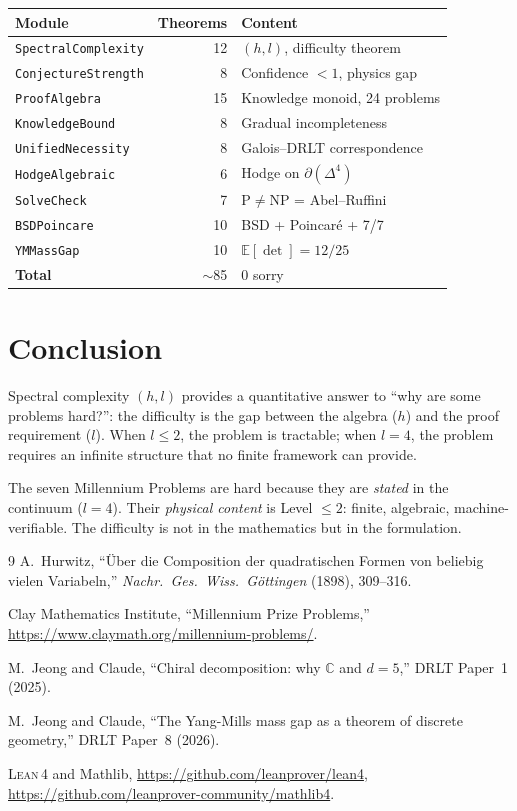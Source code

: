 \documentclass[12pt]{article}
\theoremstyle{remark}
\newcommand{\CC}{\mathbb{C}}
\newcommand{\Lean}{\textsc{Lean\,4}}
\begin{document}
\begin{center}
\begin{tabular}{lrl}
\toprule
Module & Theorems & Content \\
\midrule
\texttt{SpectralComplexity} & 12 & $(h, l)$, difficulty theorem \\
\texttt{ConjectureStrength} & 8 & Confidence $< 1$, physics gap \\
\texttt{ProofAlgebra} & 15 & Knowledge monoid, 24 problems \\
\texttt{KnowledgeBound} & 8 & Gradual incompleteness \\
\texttt{UnifiedNecessity} & 8 & Galois--DRLT correspondence \\
\texttt{HodgeAlgebraic} & 6 & Hodge on $\partial(\Delta^4)$ \\
\texttt{SolveCheck} & 7 & P$\ne$NP = Abel--Ruffini \\
\texttt{BSDPoincare} & 10 & BSD + Poincar\'e + 7/7 \\
\texttt{YMMassGap} & 10 & $\mathbb{E}[\det] = 12/25$ \\
\midrule
\textbf{Total} & $\sim$85 & 0 sorry \\
\bottomrule
\end{tabular}
\end{center}

\section{Conclusion}

Spectral complexity $(h, l)$ provides a quantitative answer
to ``why are some problems hard?'': the difficulty is the
gap between the algebra ($h$) and the proof requirement ($l$).
When $l \le 2$, the problem is tractable; when $l = 4$,
the problem requires an infinite structure that no finite
framework can provide.

The seven Millennium Problems are hard because they are
\emph{stated} in the continuum ($l = 4$). Their
\emph{physical content} is Level $\le 2$: finite,
algebraic, machine-verifiable. The difficulty is not in
the mathematics but in the formulation.

\begin{thebibliography}{9}
A.~Hurwitz, ``\"Uber die Composition der quadratischen
Formen von beliebig vielen Variabeln,''
\emph{Nachr.\ Ges.\ Wiss.\ G\"ottingen} (1898), 309--316.

Clay Mathematics Institute, ``Millennium Prize Problems,''
\url{https://www.claymath.org/millennium-problems/}.

M.~Jeong and Claude,
``Chiral decomposition: why $\CC$ and $d = 5$,''
DRLT Paper~1 (2025).

M.~Jeong and Claude,
``The Yang-Mills mass gap as a theorem of discrete geometry,''
DRLT Paper~8 (2026).

\Lean{} and Mathlib,
\url{https://github.com/leanprover/lean4},
\url{https://github.com/leanprover-community/mathlib4}.
\end{thebibliography}
\end{document}
